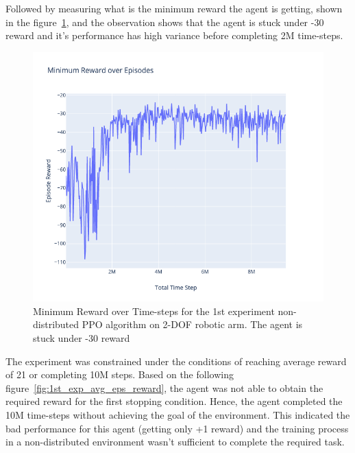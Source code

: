 Followed by measuring what is the minimum reward the agent is getting, shown in the figure~\ref{fig:1st_exp_min_eps_reward}, and the observation shows that the agent is stuck under -30 reward and it's performance has high variance before completing 2M time-steps.
\begin{figure}[H] %
	\centering
	\includegraphics[width=1.2\linewidth]{figures/exps/1st_exp/min_eps_reward}
	\caption{Minimum Reward over Time-steps for the 1st experiment non-distributed PPO algorithm on 2-DOF robotic arm. The agent is stuck under -30 reward}
	\label{fig:1st_exp_min_eps_reward}
\end{figure}
The experiment was constrained under the conditions of reaching average reward of 21 or completing 10M steps. Based on the following figure~\ref{fig:1st_exp_avg_eps_reward}, the agent was not able to obtain the required reward for the first stopping condition. Hence, the agent completed the 10M time-steps without achieving the goal of the environment. This indicated the bad performance for this agent (getting only +1 reward) and the training process in a non-distributed environment wasn't sufficient to complete the required task.
